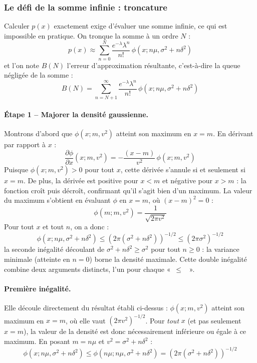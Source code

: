 \documentclass{article}
\providecommand{\og}{«~}
\providecommand{\fg}{~»}
\begin{document}
\subsubsection*{Le défi de la somme infinie : troncature}
Calculer $p(x)$ exactement exige d'évaluer une somme infinie, ce qui est impossible en pratique. On tronque la somme à un ordre $N$ :
\begin{equation}
p(x) \approx \sum_{n=0}^{N} \frac{e^{-\lambda}\lambda^n}{n!}\, \phi(x;n\mu,\sigma^2+n\delta^2)
\end{equation}
et l'on note $B(N)$ l'erreur d'approximation résultante, c'est-à-dire la queue négligée de la somme :
\begin{equation}
B(N) = \sum_{n=N+1}^{\infty} \frac{e^{-\lambda}\lambda^n}{n!}\, \phi(x;n\mu,\sigma^2+n\delta^2)
\end{equation}
\paragraph{Étape 1 -- Majorer la densité gaussienne.} Montrons d'abord que $\phi(x;m,v^2)$ atteint son maximum en $x=m$. En dérivant par rapport à $x$ :
\begin{equation}
\frac{\partial \phi}{\partial x}(x;m,v^2) = -\frac{(x-m)}{v^2}\, \phi(x;m,v^2)
\end{equation}
Puisque $\phi(x;m,v^2) > 0$ pour tout $x$, cette dérivée s'annule si et seulement si $x=m$. De plus, la dérivée est positive pour $x<m$ et négative pour $x>m$ : la fonction croît puis décroît, confirmant qu'il s'agit bien d'un maximum. La valeur du maximum s'obtient en évaluant $\phi$ en $x=m$, où $(x-m)^2=0$ :
\begin{equation}
\phi(m;m,v^2) = \frac{1}{\sqrt{2\pi v^2}}
\end{equation}
Pour tout $x$ et tout $n$, on a donc :
\begin{equation}
\phi(x;n\mu,\sigma^2+n\delta^2) \leq \left(2\pi(\sigma^2+n\delta^2)\right)^{-1/2} \leq (2\pi\sigma^2)^{-1/2}
\end{equation}
la seconde inégalité découlant de $\sigma^2+n\delta^2 \geq \sigma^2$ pour tout $n\geq 0$ : la variance minimale (atteinte en $n=0$) borne la densité maximale.
Cette double inégalité combine deux arguments distincts, l'un pour chaque \og $\leq$ \fg.
\paragraph{Première inégalité.} Elle découle directement du résultat établi ci-dessus : $\phi(x;m,v^2)$ atteint son maximum en $x=m$, où elle vaut $(2\pi v^2)^{-1/2}$. Pour \emph{tout} $x$ (et pas seulement $x=m$), la valeur de la densité est donc nécessairement inférieure ou égale à ce maximum. En posant $m=n\mu$ et $v^2 = \sigma^2+n\delta^2$ :
\begin{equation}
\phi(x;n\mu,\sigma^2+n\delta^2) \leq \phi(n\mu;n\mu,\sigma^2+n\delta^2) = \left(2\pi(\sigma^2+n\delta^2)\right)^{-1/2}
\end{equation}
\end{document}
